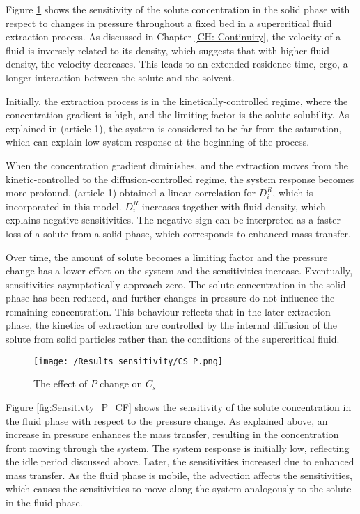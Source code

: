 \documentclass[../Article_Sensitivity_Analsysis.tex]{subfiles}
\begin{document}
	Figure \ref{fig:Sensitivty_P_CS} shows the sensitivity of the solute concentration in the solid phase with respect to changes in pressure throughout a fixed bed in a supercritical fluid extraction process. As discussed in Chapter \ref{CH: Continuity}, the velocity of a fluid is inversely related to its density, which suggests that with higher fluid density, the velocity decreases. This leads to an extended residence time, ergo, a longer interaction between the solute and the solvent.
	
	Initially, the extraction process is in the kinetically-controlled regime, where the concentration gradient is high, and the limiting factor is the solute solubility. As explained in ({\color{red}article 1}), the system is considered to be far from the saturation, which can explain low system response at the beginning of the process. 
	
	When the concentration gradient diminishes, and the extraction moves from the kinetic-controlled to the diffusion-controlled regime, the system response becomes more profound. ({\color{red}article 1}) obtained a linear correlation for $D_i^R$, which is incorporated in this model. $D_i^R$ increases together with fluid density, which explains negative sensitivities. The negative sign can be interpreted as a faster loss of a solute from a solid phase, which corresponds to enhanced mass transfer. 
	
	Over time, the amount of solute becomes a limiting factor and the pressure change has a lower effect on the system and the sensitivities increase. Eventually, sensitivities asymptotically approach zero. The solute concentration in the solid phase has been reduced, and further changes in pressure do not influence the remaining concentration. This behaviour reflects that in the later extraction phase, the kinetics of extraction are controlled by the internal diffusion of the solute from solid particles rather than the conditions of the supercritical fluid.

	\begin{figure}[h!]
		\centering
		\texttt{[image: /Results\_sensitivity/CS\_P.png]}
		\caption{The effect of $P$ change on $C_s$}
		\label{fig:Sensitivty_P_CS}
	\end{figure}
	
	Figure \ref{fig:Sensitivty_P_CF} shows the sensitivity of the solute concentration in the fluid phase with respect to the pressure change. As explained above, an increase in pressure enhances the mass transfer, resulting in the concentration front moving through the system. The system response is initially low, reflecting the idle period discussed above. Later, the sensitivities increased due to enhanced mass transfer. As the fluid phase is mobile, the advection affects the sensitivities, which causes the sensitivities to move along the system analogously to the solute in the fluid phase.
	
\end{document}
